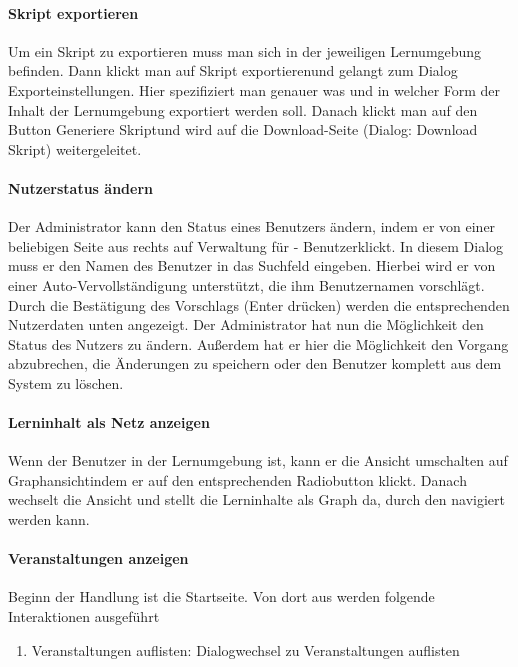\documentclass[12pt,a4paper]{article}
\begin{document}
{\paragraph{Skript exportieren}
Um ein Skript zu exportieren muss man sich in der jeweiligen Lernumgebung befinden. Dann klickt man auf \glqq Skript exportieren\grqq  und gelangt zum Dialog \glqq  Exporteinstellungen\grqq. Hier spezifiziert man genauer was und in welcher Form der Inhalt der Lernumgebung exportiert werden soll. Danach klickt man auf den Button \glqq Generiere Skript\grqq und wird auf die Download-Seite (Dialog: \glqq Download Skript\grqq ) weitergeleitet.

\paragraph{Nutzerstatus ändern}
Der Administrator kann den Status eines Benutzers ändern, indem er von einer beliebigen Seite aus rechts auf \glqq Verwaltung für - Benutzer\grqq klickt. In diesem Dialog muss er den Namen des Benutzer in das Suchfeld eingeben. Hierbei wird er von einer Auto-Vervollständigung unterstützt, die ihm Benutzernamen vorschlägt. Durch die Bestätigung des Vorschlags (Enter drücken) werden die entsprechenden Nutzerdaten unten angezeigt. Der Administrator hat nun die Möglichkeit den Status des Nutzers zu ändern.
Außerdem hat er hier die Möglichkeit den Vorgang abzubrechen, die Änderungen zu speichern oder den Benutzer komplett aus dem System zu löschen.

\paragraph{Lerninhalt als Netz anzeigen}
Wenn der Benutzer in der Lernumgebung ist, kann er die Ansicht umschalten auf \glqq Graphansicht\grqq indem er auf den entsprechenden Radiobutton klickt. Danach wechselt die Ansicht und stellt die Lerninhalte als Graph da, durch den navigiert werden kann.
\paragraph{Veranstaltungen anzeigen}
Beginn der Handlung ist die Startseite. Von dort aus werden folgende Interaktionen ausgeführt
\begin{enumerate}
\item \glqq Veranstaltungen auflisten\grqq: Dialogwechsel zu \glqq Veranstaltungen auflisten\grqq
\end{enumerate}

}
\end{document}
